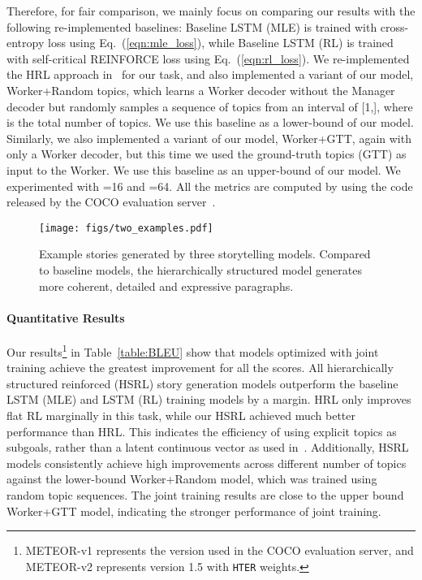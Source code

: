 \documentclass[letterpaper]{article} \usepackage{aaai19}  \usepackage{times}  \usepackage{helvet}  \usepackage{courier}  \usepackage{url}  \usepackage{graphicx}
\begin{document}
Therefore, for fair comparison, we mainly focus on comparing our results with the following re-implemented baselines: Baseline LSTM (MLE) is trained with cross-entropy loss using Eq.~(\ref{eqn:mle_loss}), while Baseline LSTM (RL) is trained with self-critical REINFORCE loss using Eq.~(\ref{eqn:rl_loss}). We re-implemented the HRL approach in~\cite{wang2018video} for our task, and also implemented a variant of our model, Worker+Random topics, which learns a Worker decoder without the Manager decoder but randomly samples a sequence of topics from an interval of [1,], where  is the total number of topics. We use this baseline as a lower-bound of our model. 
Similarly, we also implemented a variant of our model, Worker+GTT, again with only a Worker decoder, but this time we used the ground-truth topics (GTT) as input to the Worker. We use this baseline as an upper-bound of our model. We experimented with =16 and =64. 
All the metrics are computed by using the code released by the COCO evaluation server~\cite{chen2015microsoft}.


\begin{figure*}[t]
	\centering
	\texttt{[image: figs/two\_examples.pdf]}
	\caption{\small Example stories generated by three storytelling models. Compared to baseline models, the hierarchically structured model generates more coherent, detailed and expressive paragraphs.}
	\label{fig:stories}
\end{figure*}

\paragraph{Quantitative Results} 
Our results\footnote{METEOR-v1 represents the version used in the COCO evaluation server, and METEOR-v2 represents version 1.5 with \texttt{HTER} weights.} in Table~\ref{table:BLEU} show that models optimized with joint training achieve the greatest improvement for all the scores.
All hierarchically structured reinforced (HSRL) story generation models outperform the baseline LSTM (MLE) and LSTM (RL) training models by a margin. HRL only improves flat RL marginally in this task, while our HSRL achieved much better performance than HRL.
This indicates the efficiency of using explicit topics as subgoals, rather than a latent continuous vector as used in~\cite{wang2018video}.
Additionally, HSRL models consistently achieve high improvements across different number of topics against the lower-bound Worker+Random model, which was trained using random topic sequences. The joint training results are close to the upper bound Worker+GTT model, indicating the stronger performance of joint training.
\end{document}
